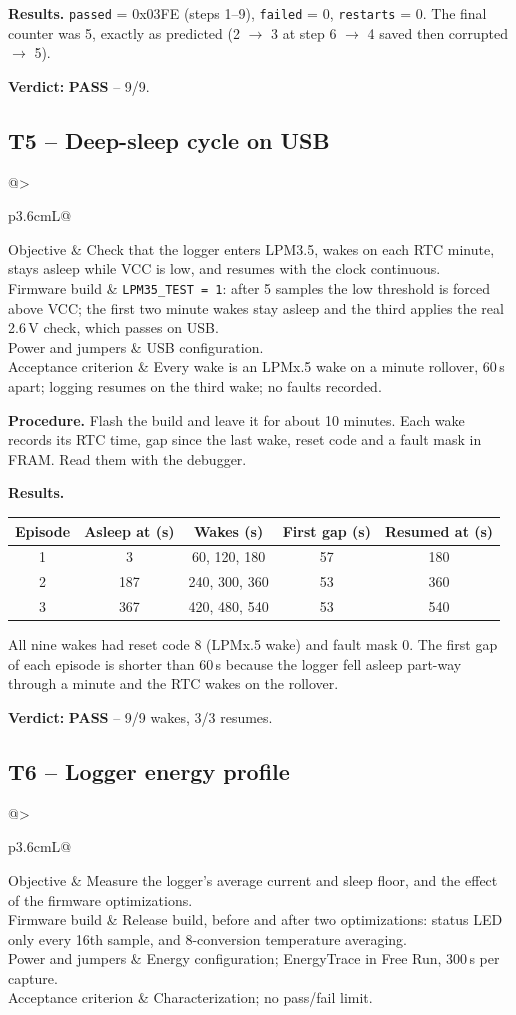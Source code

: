 \documentclass[11pt,a4paper]{article}
\makeatletter
\newcommand{\code}[1]{\texttt{#1}}
\newcommand{\pass}{\textbf{\textcolor{green!45!black}{PASS}}}
\newcommand{\testcase}[7]{%
  \subsection{#1 -- #2}\label{#3}
  \noindent\begin{tabularx}{\textwidth}{@{}>{\raggedright\arraybackslash\bfseries}p{3.6cm}L@{}}
  \toprule
  Objective & #4 \\
  Firmware build & #5 \\
  Power and jumpers & #6 \\
  Acceptance criterion & #7 \\
  \bottomrule
  \end{tabularx}\par\medskip}
\makeatother
\begin{document}
\textbf{Results.} \code{passed} = 0x03FE (steps 1--9), \code{failed} = 0, \code{restarts} = 0. The final counter was 5, exactly as predicted (2 $\rightarrow$ 3 at step 6 $\rightarrow$ 4 saved then corrupted $\rightarrow$ 5).

\textbf{Verdict:} \pass{} -- 9/9.

\testcase{T5}{Deep-sleep cycle on USB}{t:lpm35}
  {Check that the logger enters LPM3.5, wakes on each RTC minute, stays asleep while VCC is low, and resumes with the clock continuous.}
  {\code{LPM35\_TEST = 1}: after 5 samples the low threshold is forced above VCC; the first two minute wakes stay asleep and the third applies the real 2.6\,V check, which passes on USB.}
  {USB configuration.}
  {Every wake is an LPMx.5 wake on a minute rollover, 60\,s apart; logging resumes on the third wake; no faults recorded.}

\textbf{Procedure.} Flash the build and leave it for about 10 minutes. Each wake records its RTC time, gap since the last wake, reset code and a fault mask in FRAM. Read them with the debugger.

\textbf{Results.}
\begin{table}[H]
\centering\small
\begin{tabular}{@{}ccccc@{}}
\toprule
Episode & Asleep at (s) & Wakes (s) & First gap (s) & Resumed at (s) \\
\midrule
1 & 3 & 60, 120, 180 & 57 & 180 \\
2 & 187 & 240, 300, 360 & 53 & 360 \\
3 & 367 & 420, 480, 540 & 53 & 540 \\
\bottomrule
\end{tabular}
\end{table}
All nine wakes had reset code 8 (LPMx.5 wake) and fault mask 0. The first gap of each episode is shorter than 60\,s because the logger fell asleep part-way through a minute and the RTC wakes on the rollover.

\textbf{Verdict:} \pass{} -- 9/9 wakes, 3/3 resumes.

\testcase{T6}{Logger energy profile}{t:energy}
  {Measure the logger's average current and sleep floor, and the effect of the firmware optimizations.}
  {Release build, before and after two optimizations: status LED only every 16th sample, and 8-conversion temperature averaging.}
  {Energy configuration; EnergyTrace in Free Run, 300\,s per capture.}
  {Characterization; no pass/fail limit.}
\end{document}
